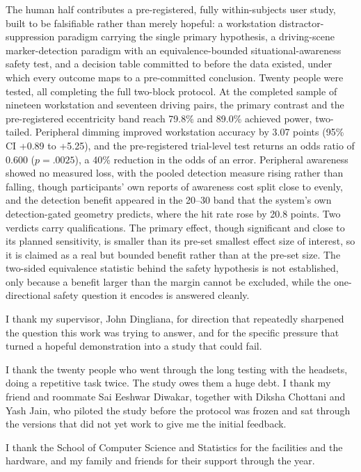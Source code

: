 \documentclass[a4paper, 12pt, oneside]{report}
\begin{document}
\begin{thesisabstract}
The human half contributes a pre-registered, fully within-subjects user study, built to be
falsifiable rather than merely hopeful: a workstation distractor-suppression paradigm carrying the
single primary hypothesis, a driving-scene marker-detection paradigm with an equivalence-bounded
situational-awareness safety test, and a decision table committed to before the data existed, under
which every outcome maps to a pre-committed conclusion. Twenty people were tested, all completing
the full two-block protocol. At the completed
sample of nineteen workstation and seventeen driving pairs, the primary contrast and the
pre-registered eccentricity band reach 79.8\% and 89.0\% achieved power, two-tailed. Peripheral dimming
improved workstation accuracy by 3.07 points (95\% CI +0.89 to +5.25), and the pre-registered
trial-level test returns an odds ratio of 0.600 ($p = .0025$), a 40\% reduction in the odds of an
error. Peripheral awareness showed no measured loss, with the pooled detection measure rising rather than
falling, though participants' own reports of awareness cost split close to evenly, and the detection
benefit appeared in
the 20--30\textdegree{} band that the system's own detection-gated geometry predicts, where the hit
rate rose by 20.8 points. Two verdicts carry qualifications. The
primary effect, though significant and close to its planned sensitivity, is smaller than its pre-set smallest
effect size of interest, so it is claimed as a real but bounded benefit rather than at the pre-set
size. The two-sided equivalence statistic behind the safety hypothesis is not established, only
because a benefit larger than the margin cannot be excluded, while the one-directional safety
question it encodes is answered cleanly.
\end{thesisabstract}

\begin{thesisacknowledgments}
I thank my supervisor, John Dingliana, for direction that repeatedly sharpened the question this
work was trying to answer, and for the specific pressure that turned a hopeful demonstration into a
study that could fail.

I thank the twenty people who went through the long testing with the headsets, doing a repetitive
task twice. The study owes them a huge debt. I thank my friend and roommate Sai Eeshwar Diwakar,
together with Diksha Chottani and Yash Jain, who piloted the study before the protocol was frozen and
sat through the versions that did not yet work to give me the initial feedback.

I thank the School of Computer Science and Statistics for the facilities and the hardware, and my
family and friends for their support through the year.
\end{thesisacknowledgments}
\end{document}
